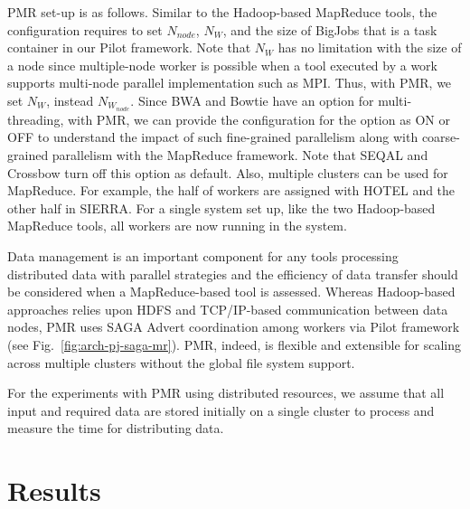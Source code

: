 \documentclass{sig-alternate}
\begin{document}
{PMR set-up is as follows.  Similar to the Hadoop-based MapReduce tools, the configuration requires to set $N_{node}$, $N_W$, and the size of BigJobs that is a task container in our Pilot framework\cite{pmr2012,saga_bigjob_condor_cloud,pstar11}.  Note that $N_W$ has no limitation with the size of a node since multiple-node worker is possible when a tool executed by a work supports multi-node parallel implementation such as MPI.  Thus, with PMR, we set $N_W$, instead $N_{W_{node}}$.  Since BWA and Bowtie have an option for multi-threading, with PMR, we can provide the configuration for the option as ON or OFF to understand the impact of such fine-grained parallelism along with coarse-grained parallelism with the MapReduce framework.  Note that SEQAL and Crossbow turn off this option as default.  Also, multiple clusters can be used for MapReduce. For example, the half of workers are assigned with HOTEL and the other half in SIERRA.  For a single system set up, like the two Hadoop-based MapReduce tools, all workers are now running in the system.  

Data management is an important component for any tools processing distributed data with parallel strategies and the efficiency of data transfer should be considered when a MapReduce-based tool is assessed.  Whereas Hadoop-based approaches relies upon HDFS and TCP/IP-based communication between data nodes, PMR uses SAGA Advert coordination among workers via Pilot framework (see Fig.~\ref{fig:arch-pj-saga-mr}).  PMR, indeed, is flexible and extensible for scaling across multiple clusters without the global file system support.  
 
 
For the experiments with PMR using distributed resources, we assume
that all input and required data are stored initially on a single
cluster to process and measure the time for distributing data.



\section{Results}\label{sec:results}

}
\end{document}
